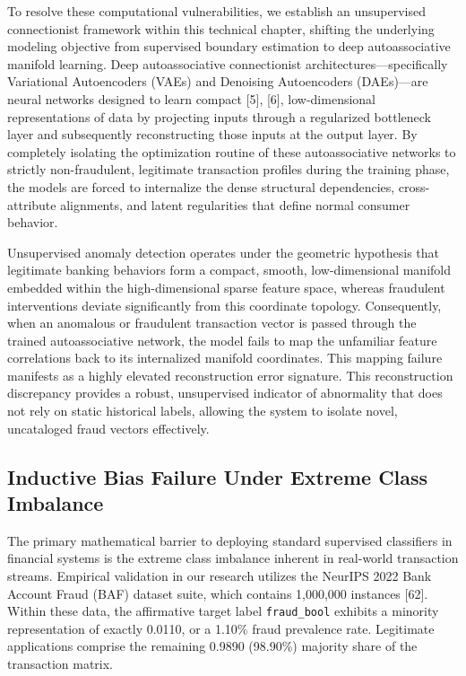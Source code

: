 \documentclass[11pt,a4paper]{report}
\begin{document}
To resolve these computational vulnerabilities, we establish an unsupervised connectionist framework within this technical chapter, shifting the underlying modeling objective from supervised boundary estimation to deep autoassociative manifold learning. Deep autoassociative connectionist architectures---specifically Variational Autoencoders (VAEs) and Denoising Autoencoders (DAEs)---are neural networks designed to learn compact [5], [6], low-dimensional representations of data by projecting inputs through a regularized bottleneck layer and subsequently reconstructing those inputs at the output layer. By completely isolating the optimization routine of these autoassociative networks to strictly non-fraudulent, legitimate transaction profiles during the training phase, the models are forced to internalize the dense structural dependencies, cross-attribute alignments, and latent regularities that define normal consumer behavior. 

Unsupervised anomaly detection operates under the geometric hypothesis that legitimate banking behaviors form a compact, smooth, low-dimensional manifold embedded within the high-dimensional sparse feature space, whereas fraudulent interventions deviate significantly from this coordinate topology. Consequently, when an anomalous or fraudulent transaction vector is passed through the trained autoassociative network, the model fails to map the unfamiliar feature correlations back to its internalized manifold coordinates. This mapping failure manifests as a highly elevated reconstruction error signature. This reconstruction discrepancy provides a robust, unsupervised indicator of abnormality that does not rely on static historical labels, allowing the system to isolate novel, uncataloged fraud vectors effectively.

\subsection{Inductive Bias Failure Under Extreme Class Imbalance}
The primary mathematical barrier to deploying standard supervised classifiers in financial systems is the extreme class imbalance inherent in real-world transaction streams. Empirical validation in our research utilizes the NeurIPS 2022 Bank Account Fraud (BAF) dataset suite, which contains 1,000,000 instances [62]. Within these data, the affirmative target label \texttt{fraud\_bool} exhibits a minority representation of exactly 0.0110, or a 1.10\% fraud prevalence rate. Legitimate applications comprise the remaining 0.9890 (98.90\%) majority share of the transaction matrix. 
\end{document}

